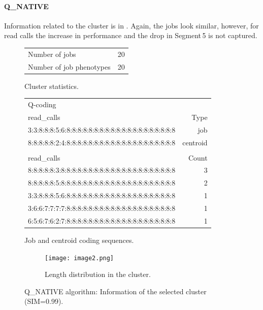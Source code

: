 \documentclass{jhps}
\begin{document}
\FloatBarrier
\paragraph{Q\_NATIVE}
Information related to the cluster is in .
Again, the jobs look similar, however, for read calls the increase in performance and the drop in Segment\,5 is not captured.

\begin{figure}
	\begin{subtable}{\textwidth}
		\centering
		\begin{tabular}{ll}
			Number of jobs & 20 \\
			Number of job phenotypes & 20 \\
		\end{tabular}
		\caption{Cluster statistics.}
		\label{cluster:use_case:hex_native:stats}
	\end{subtable}
	\medskip
	\begin{subtable}{\textwidth}
		\centering
		\begin{tiny}
			\begin{tabular}{l|r}
				\rowcolor{tblhead}
				Q-coding & \\
				\rowcolor{tblhead}
				read\_calls                                           & Type     \\
				\hline
				3:3:8:8:8:5:6:8:8:8:8:8:8:8:8:8:8:8:8:8:8:8:8:8:8:8:8 & job      \\
				8:8:8:8:8:2:4:8:8:8:8:8:8:8:8:8:8:8:8:8:8:8:8:8:8:8:8 & centroid \\
				\multicolumn{2}{l}{}\\
				\rowcolor{tblhead}
				read\_calls                                           & Count    \\
				\hline
				8:8:8:8:8:3:8:8:8:8:8:8:8:8:8:8:8:8:8:8:8:8:8:8:8:8:8 & 3        \\
				8:8:8:8:8:5:8:8:8:8:8:8:8:8:8:8:8:8:8:8:8:8:8:8:8:8:8 & 2        \\
				3:3:8:8:8:5:6:8:8:8:8:8:8:8:8:8:8:8:8:8:8:8:8:8:8:8:8 & 1        \\
				3:6:6:7:7:7:7:8:8:8:8:8:8:8:8:8:8:8:8:8:8:8:8:8:8:8:8 & 1        \\
				6:5:6:7:6:2:7:8:8:8:8:8:8:8:8:8:8:8:8:8:8:8:8:8:8:8:8 & 1        \\
			\end{tabular}
		\end{tiny}
		\caption{Job and centroid coding sequences.}
		\label{cluster:use_case:hex_native:job_centroid}
	\end{subtable}
	\medskip
	\begin{subfigure}{\textwidth}
		\centering
		\texttt{[image: image2.png]}
		\caption{Length distribution in the cluster.}
		\label{cluster:use_case:hex_native:length}
	\end{subfigure}
	\caption{Q\_NATIVE algorithm: Information of the selected cluster (SIM=0.99).}
	\label{cluster:use_case:hex_native}
\end{figure}
\end{document}
